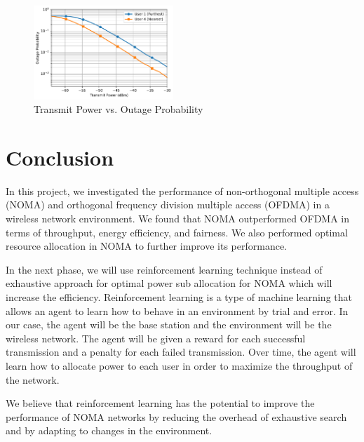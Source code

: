\documentclass[conference]{IEEEtran}
\begin{document}
\begin{figure}[t!]
    \centering
    \includegraphics[width=0.47\textwidth, height= 0.35\textwidth]{figures/outage_probability.pdf}
    \caption{Transmit Power vs. Outage Probability}
\end{figure}

\section{Conclusion}
In this project, we investigated the performance of non-orthogonal multiple access (NOMA) and orthogonal frequency division multiple access (OFDMA) in a wireless network environment. We found that NOMA outperformed OFDMA in terms of throughput, energy efficiency, and fairness. We also performed optimal resource allocation in NOMA to further improve its performance.

In the next phase, we will use reinforcement learning technique instead of exhaustive approach for optimal power sub allocation for NOMA which will increase the efficiency. Reinforcement learning is a type of machine learning that allows an agent to learn how to behave in an environment by trial and error. In our case, the agent will be the base station and the environment will be the wireless network. The agent will be given a reward for each successful transmission and a penalty for each failed transmission. Over time, the agent will learn how to allocate power to each user in order to maximize the throughput of the network.

We believe that reinforcement learning has the potential to improve the performance of NOMA networks by reducing the overhead of exhaustive search and by adapting to changes in the environment.



	
\end{document}

